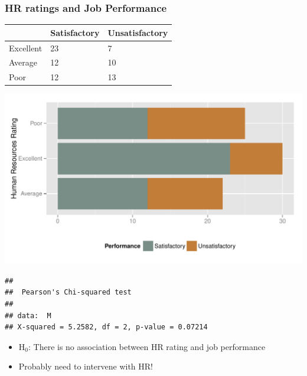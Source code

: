 \documentclass[dvipsnames]{beamer}\usepackage[]{graphicx}\usepackage[]{color}
\makeatletter
\def\maxwidth{ %
  \ifdim\Gin@nat@width>\linewidth
    \linewidth
  \else
    \Gin@nat@width
  \fi
}
\newenvironment{kframe}{%
 \def\at@end@of@kframe{}%
 \ifinner\ifhmode%
  \def\at@end@of@kframe{\end{minipage}}%
  \begin{minipage}{\columnwidth}%
 \fi\fi%
 \def\FrameCommand##1{\hskip\@totalleftmargin \hskip-\fboxsep
 \colorbox{shadecolor}{##1}\hskip-\fboxsep
     \hskip-\linewidth \hskip-\@totalleftmargin \hskip\columnwidth}%
 \MakeFramed {\advance\hsize-\width
   \@totalleftmargin\z@ \linewidth\hsize
   \@setminipage}}%
 {\par\unskip\endMakeFramed%
 \at@end@of@kframe}
\newenvironment{knitrout}{}{} %
\makeatother
\begin{document}
\begin{frame}[fragile]
\frametitle{HR ratings and Job Performance}
\begin{center}
\begin{tabular}{lll}
\hline
& Satisfactory & Unsatisfactory \\
\hline
Excellent & 23 & 7 \\
Average & 12 & 10 \\
Poor & 12 & 13 \\
\hline
\end{tabular}
\end{center}
\begin{knitrout}
\color{fgcolor}

{\centering \includegraphics[width=\maxwidth]{figure/unnamed-chunk-5-1} 

}



\end{knitrout}

\end{frame}


\begin{frame}[fragile]
\begin{knitrout}
\color{fgcolor}\begin{kframe}
\begin{verbatim}
## 
## 	Pearson's Chi-squared test
## 
## data:  M
## X-squared = 5.2582, df = 2, p-value = 0.07214
\end{verbatim}
\end{kframe}
\end{knitrout}

\begin{itemize}
  \item<1-> H$_0$: There is no association between HR rating and job performance
  \item<2-> Probably need to intervene with HR!
\end{itemize}
\end{frame}
\end{document}
